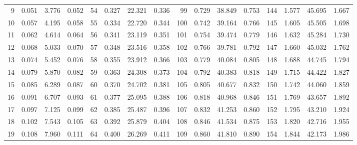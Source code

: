 \begin{table}
{\begin{tabular}{rrrr|rrrr|rrrr|rrrr}
  9 & \tiny{  0.051} &   3.776 & \tiny{  0.052} &  54 & \tiny{  0.327} &  22.321 & \tiny{  0.336} &  99 & \tiny{  0.729} &  38.849 & \tiny{  0.753} & 144 & \tiny{  1.577} &  45.695 & \tiny{  1.667}\\
 10 & \tiny{  0.057} &   4.195 & \tiny{  0.058} &  55 & \tiny{  0.334} &  22.720 & \tiny{  0.344} & 100 & \tiny{  0.742} &  39.164 & \tiny{  0.766} & 145 & \tiny{  1.605} &  45.505 & \tiny{  1.698}\\
 11 & \tiny{  0.062} &   4.614 & \tiny{  0.064} &  56 & \tiny{  0.341} &  23.119 & \tiny{  0.351} & 101 & \tiny{  0.754} &  39.474 & \tiny{  0.779} & 146 & \tiny{  1.632} &  45.284 & \tiny{  1.730}\\
 12 & \tiny{  0.068} &   5.033 & \tiny{  0.070} &  57 & \tiny{  0.348} &  23.516 & \tiny{  0.358} & 102 & \tiny{  0.766} &  39.781 & \tiny{  0.792} & 147 & \tiny{  1.660} &  45.032 & \tiny{  1.762}\\
 13 & \tiny{  0.074} &   5.452 & \tiny{  0.076} &  58 & \tiny{  0.355} &  23.912 & \tiny{  0.366} & 103 & \tiny{  0.779} &  40.084 & \tiny{  0.805} & 148 & \tiny{  1.688} &  44.745 & \tiny{  1.794}\\
 14 & \tiny{  0.079} &   5.870 & \tiny{  0.082} &  59 & \tiny{  0.363} &  24.308 & \tiny{  0.373} & 104 & \tiny{  0.792} &  40.383 & \tiny{  0.818} & 149 & \tiny{  1.715} &  44.422 & \tiny{  1.827}\\
 15 & \tiny{  0.085} &   6.289 & \tiny{  0.087} &  60 & \tiny{  0.370} &  24.702 & \tiny{  0.381} & 105 & \tiny{  0.805} &  40.677 & \tiny{  0.832} & 150 & \tiny{  1.742} &  44.060 & \tiny{  1.859}\\
 16 & \tiny{  0.091} &   6.707 & \tiny{  0.093} &  61 & \tiny{  0.377} &  25.095 & \tiny{  0.388} & 106 & \tiny{  0.818} &  40.968 & \tiny{  0.846} & 151 & \tiny{  1.769} &  43.657 & \tiny{  1.892}\\
 17 & \tiny{  0.097} &   7.125 & \tiny{  0.099} &  62 & \tiny{  0.385} &  25.487 & \tiny{  0.396} & 107 & \tiny{  0.832} &  41.253 & \tiny{  0.860} & 152 & \tiny{  1.795} &  43.210 & \tiny{  1.924}\\
 18 & \tiny{  0.102} &   7.543 & \tiny{  0.105} &  63 & \tiny{  0.392} &  25.879 & \tiny{  0.404} & 108 & \tiny{  0.846} &  41.534 & \tiny{  0.875} & 153 & \tiny{  1.820} &  42.716 & \tiny{  1.955}\\
 19 & \tiny{  0.108} &   7.960 & \tiny{  0.111} &  64 & \tiny{  0.400} &  26.269 & \tiny{  0.411} & 109 & \tiny{  0.860} &  41.810 & \tiny{  0.890} & 154 & \tiny{  1.844} &  42.173 & \tiny{  1.986}\\

\end{tabular}}
\end{table}

